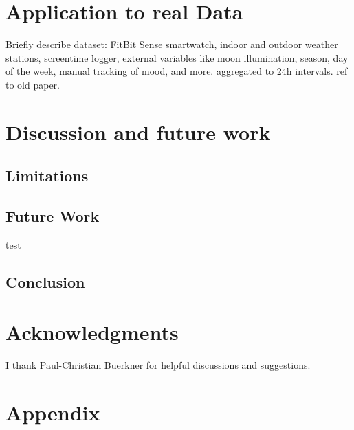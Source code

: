 \documentclass[conference]{IEEEtran}
\begin{document}
\section{Application to real Data}
Briefly describe dataset: FitBit Sense smartwatch, indoor and outdoor weather stations, screentime logger, external variables like moon illumination, season, day of the week, manual tracking of mood, and more. aggregated to 24h intervals.
ref to old paper.




\section{Discussion and future work}





\subsection{Limitations}



\subsection{Future Work}

test\cite{peters_identifiability_2014}

\subsection{Conclusion}



\section{Acknowledgments}
I thank Paul-Christian Buerkner for helpful discussions and suggestions.







\section{Appendix}
\label{sec:Appendix}
\end{document}
